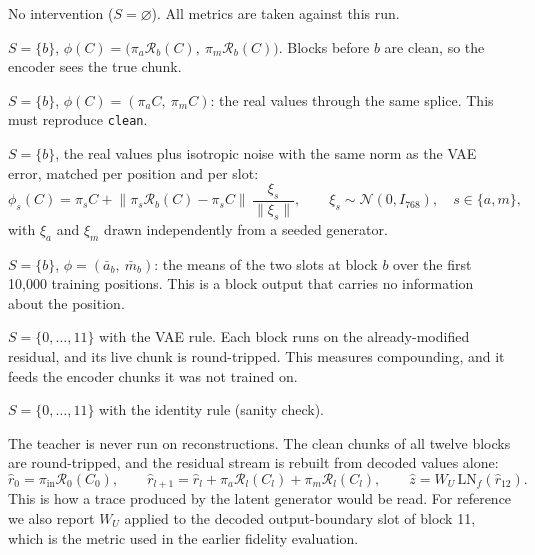 \documentclass[11pt]{article}
\newcommand{\LN}{\mathrm{LN}}
\newcommand{\RT}{\mathcal{R}}
\begin{document}
\begin{description}[leftmargin=1.2em]
  \item[\texttt{clean}.] No intervention ($S = \varnothing$). All metrics are taken against this run.
  \item[\texttt{vae\_b}.] $S = \{b\}$, $\phi(C) = \big(\pi_a \RT_b(C),\ \pi_m \RT_b(C)\big)$. Blocks before $b$ are
    clean, so the encoder sees the true chunk.
  \item[\texttt{identity\_b}.] $S = \{b\}$, $\phi(C) = (\pi_a C,\ \pi_m C)$: the real values through the same splice.
    This must reproduce \texttt{clean}.
  \item[\texttt{noise\_b}.] $S = \{b\}$, the real values plus isotropic noise with the same norm as the VAE error,
    matched per position and per slot:
    \begin{equation}
      \phi_s(C) = \pi_s C + \big\lVert \pi_s \RT_b(C) - \pi_s C \big\rVert\,\frac{\xi_s}{\lVert \xi_s \rVert},
      \qquad \xi_s \sim \mathcal{N}(0, I_{768}),\quad s \in \{a, m\},
    \end{equation}
    with $\xi_a$ and $\xi_m$ drawn independently from a seeded generator.
  \item[\texttt{meanabl\_b}.] $S = \{b\}$, $\phi = (\bar a_b,\ \bar m_b)$: the means of the two slots at block $b$ over the
    first 10{,}000 training positions. This is a block output that carries no information about the position.
  \item[\texttt{stack\_closed}.] $S = \{0,\dots,11\}$ with the VAE rule. Each block runs on the already-modified residual,
    and its live chunk is round-tripped. This measures compounding, and it feeds the encoder chunks it was not trained on.
  \item[\texttt{stack\_identity}.] $S = \{0,\dots,11\}$ with the identity rule (sanity check).
  \item[\texttt{stack\_open}.] The teacher is never run on reconstructions. The clean chunks of all twelve blocks are
    round-tripped, and the residual stream is rebuilt from decoded values alone:
    \begin{equation}
      \hat r_0 = \pi_{\text{in}} \RT_0(C_0), \qquad
      \hat r_{l+1} = \hat r_l + \pi_a \RT_l(C_l) + \pi_m \RT_l(C_l), \qquad
      \hat z = W_U\, \LN_f(\hat r_{12}).
    \end{equation}
    This is how a trace produced by the latent generator would be read. For reference we also report $W_U$ applied to the
    decoded output-boundary slot of block 11, which is the metric used in the earlier fidelity evaluation.
\end{description}
\end{document}
